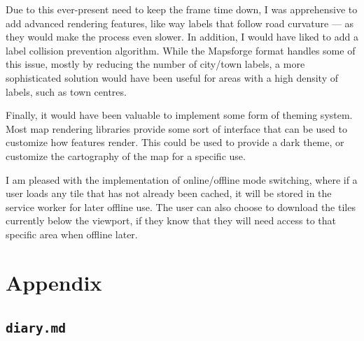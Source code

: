 \documentclass[hyphens]{final_report}
\begin{document}
Due to this ever-present need to keep the frame time down, I was apprehensive to add advanced rendering features, like way labels that follow road curvature --- as they would make the process even slower. In addition, I would have liked to add a label collision prevention algorithm. While the Mapsforge format handles some of this issue, mostly by reducing the number of city/town labels, a more sophisticated solution would have been useful for areas with a high density of labels, such as town centres.

Finally, it would have been valuable to implement some form of theming system. Most map rendering libraries provide some sort of interface that can be used to customize how features render. This could be used to provide a dark theme, or customize the cartography of the map for a specific use.

I am pleased with the implementation of online/offline mode switching, where if a user loads any tile that has not already been cached, it will be stored in the service worker for later offline use. The user can also choose to download the tiles currently below the viewport, if they know that they will need access to that specific area when offline later.

\clearpage
\chapter{Appendix}

\section{\texttt{diary.md}}



\clearpage
{}

\renewcommand*{\bibfont}{\normalfont\small}
\printbibliography{}
\end{document}
